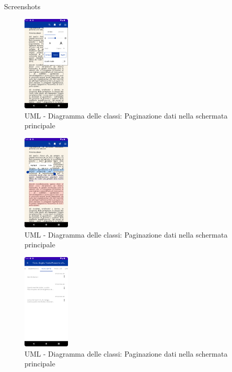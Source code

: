 \documentclass[10pt]{beamer}
\begin{document}
        \begin{frame}{Screenshots}
    \begin{multicols}{3}
        \begin{figure}[H]
        \includegraphics[width=0.2\textwidth]{reader_settings.png}
        \caption{UML - Diagramma delle classi: Paginazione dati nella schermata principale}
        \label{reader}
        \end{figure}
        
                \begin{figure}[H]
        \includegraphics[width=0.2\textwidth]{annotations.png}
        \caption{UML - Diagramma delle classi: Paginazione dati nella schermata principale}
        \label{annotations}
        \end{figure}
                        \begin{figure}[H]
        \includegraphics[width=0.2\textwidth]{annotation2.png}
        \caption{UML - Diagramma delle classi: Paginazione dati nella schermata principale}
        \label{annotation2}
        \end{figure}
        \end{multicols}
    \end{frame}
\end{document}
